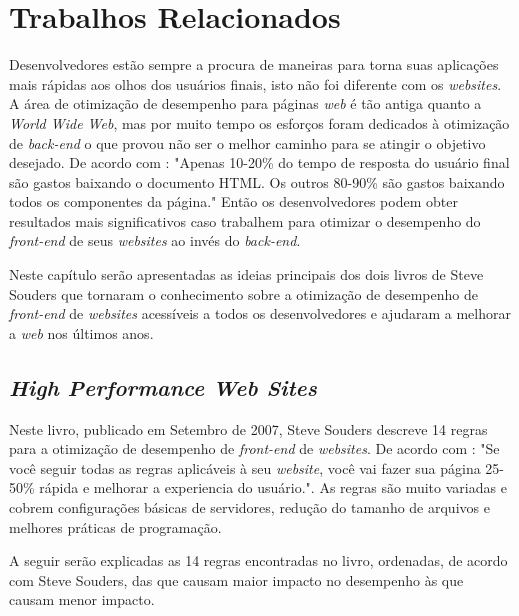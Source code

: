 %
%

\chapter{Trabalhos Relacionados}
Desenvolvedores estão sempre a procura de maneiras para torna suas aplicações mais rápidas aos olhos dos usuários finais, isto não foi diferente com os \textit{websites}. A área de otimização de desempenho para páginas \textit{web} é tão antiga quanto a \textit{World Wide Web}, mas por muito tempo os esforços foram dedicados à otimização de \textit{back-end} o que \cite{HighPerformance} provou não ser o melhor caminho para se atingir o objetivo desejado. De acordo com : "Apenas 10-20\% do tempo de resposta do usuário final são gastos baixando o documento HTML. Os outros 80-90\% são gastos baixando todos os componentes da página." Então os desenvolvedores podem obter resultados mais significativos caso trabalhem para otimizar o desempenho do \textit{front-end} de seus \textit{websites} ao invés do \textit{back-end}.

Neste capítulo serão apresentadas as ideias principais dos dois livros  de Steve Souders que tornaram o conhecimento sobre a otimização de desempenho de \textit{front-end} de \textit{websites} acessíveis a todos os desenvolvedores e ajudaram a melhorar a \textit{web} nos últimos anos.

\section{\textit{High Performance Web Sites}}
\label{sec:highperformancewebsites}

Neste livro, publicado em Setembro de 2007, Steve Souders descreve 14 regras para a otimização de desempenho de \textit{front-end} de \textit{websites}. De acordo com : "Se você seguir todas as regras aplicáveis à seu \textit{website}, você vai fazer sua página 25-50\% rápida e melhorar a experiencia do usuário.". As regras são muito variadas e cobrem configurações básicas de servidores, redução do tamanho de arquivos e melhores práticas de programação.

A seguir serão explicadas as 14 regras encontradas no livro, ordenadas, de acordo com Steve Souders, das que causam maior impacto no desempenho às que causam menor impacto.

